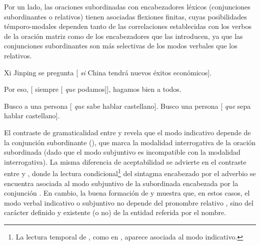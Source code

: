 Por un lado, las oraciones subordinadas con encabezadores léxicos (conjunciones
subordinantes o relativos) tienen asociadas flexiones finitas, cuyas
posibilidades témporo-modales dependen tanto de las correlaciones establecidas
con los verbos de la oración matriz como de los encabezadores que las introducen,
ya que las conjunciones subordinantes son más selectivas de los modos verbales
que los relativos.

\begin{exe}
  \ex\label{ex:13-modo1}
    \begin{xlist}
      \ex\label{ex:13-modo1-a} Xi Jinping se pregunta [ \textit{si} China
          tendrá nuevos éxitos económicos].
    \end{xlist}
  \ex\label{ex:13-modo2}
    \begin{xlist}
      \ex\label{ex:13-modo2-a} Por eso, [ siempre [
          \textit{que} podamos]], hagamos bien a todos.
    \end{xlist}
  \ex\label{ex:13-modo3}
    \begin{xlist}
      \ex\label{ex:13-modo3-a} Busco a una persona [ \textit{que} sabe
          hablar castellano].
      \ex\label{ex:13-modo3-b} Busco una persona [ \textit{que} sepa
          hablar castellano].
    \end{xlist}
\end{exe}

El contraste de gramaticalidad entre  y
 revela que el modo indicativo depende de la conjunción
subordinante (), que marca la modalidad interrogativa de la oración
subordinada (dado que el modo subjuntivo es incompatible con la modalidad
interrogativa). La misma diferencia de aceptabilidad se advierte en el contraste
entre  y , donde la lectura
condicional\footnote{La lectura temporal de , como en
, aparece asociada al modo
indicativo.} del sintagma encabezado por el adverbio  se encuentra
asociada al modo subjuntivo de la subordinada encabezada por la conjunción
. En cambio, la buena formación de  y
 muestra que, en estos casos, el modo verbal indicativo o
subjuntivo no depende del pronombre relativo , sino del carácter
definido y existente (o no) de la entidad referida por el nombre.

